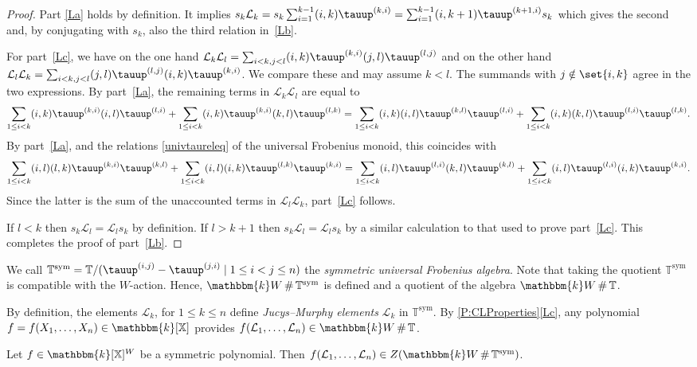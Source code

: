 \documentclass[a4paper,11pt]{amsart}
\numberwithin{equation}{subsection}
\theoremstyle{definition}
\theoremstyle{theorem}
\theoremstyle{remark}
\newcommand\CL{\mathcal{L}}
\newcommand\Sym{W}
\newcommand\op{\operatorname}
\newcommand{\ttau}{\tauup}
\newcommand\X{\mathbb{X}}
\newcommand\kk{\mathbbm{k}}
\newcommand\Tos{\mathbb{T}}
\newcommand\Tosym{\mathbb{T}^{\op{sym}}}
\DeclareMathOperator\Smash{\#}
\begin{document}
\begin{proof}
Part  \autoref{La} holds by definition. It implies
$s_k\CL_k=s_k\sum_{i=1}^{k-1}(i,k)\ttau^{(k,i)}=\sum_{i=1}^{k-1}(i,k+1)\ttau^{(k+1,i)}s_k$ which gives the
second and, by conjugating with $s_k$,  also the third relation in~\autoref{Lb}.

For part~\autoref{Lc}, we have on the one hand $\CL_k\CL_l=\sum_{i<k,
j<l}(i,k)\ttau^{(k,i)}(j,l)\ttau^{(l,j)}$ and on the other hand
$\CL_l\CL_k=\sum_{i<k, j<l}(j,l)\ttau^{(l,j)}(i,k)\ttau^{(k,i)}$. We compare these and may
assume $k<l$. The summands with $j\notin\set{i,k}$ agree in the two
expressions. By part~\autoref{La}, the remaining terms in $\CL_k\CL_l$
are equal to
\[\sum_{1\leq i<k} (i,k)\ttau^{(k,i)}(i,l)\ttau^{(l,i)}+\sum_{1\leq i<k}(i,k)\ttau^{(k,i)}(k,l)\ttau^{(l,k)}
=\sum_{1\leq i<k} (i,k)(i,l)\ttau^{(k,l)}\ttau^{(l,i)}+\sum_{1\leq i<k}(i,k)(k,l)\ttau^{(l,i)}\ttau^{(l,k)}.
\]
By part~\autoref{La}, and the relations \autoref{univtaureleq} of the universal Frobenius monoid, this coincides with
\[
\sum_{1\leq i<k}
(i,l)(l,k)\ttau^{(k,i)}\ttau^{(k,l)}+\sum_{1\leq i<k}(i,l)(i,k)\ttau^{(l,k)}\ttau^{(k,i)}
=\sum_{1\leq i<k} (i,l)\ttau^{(l,i)}(k,l)\ttau^{(k,l)}+\sum_{1\leq i<k}(i,l)\ttau^{(l,i)}(i,k)\ttau^{(k,i)}.
\]
Since the latter is the sum of the unaccounted terms in $\CL_l\CL_k$, part~\autoref{Lc} follows.

If $l<k$ then $s_k\CL_l=\CL_ls_k$ by definition. If $l>k+1$
 then $s_k\CL_l=\CL_ls_k$ by a similar calculation to that used to
prove part~\autoref{Lc}. This completes the proof of part~\autoref{Lb}.
\end{proof}
We call  $\Tosym=\Tos/(\ttau^{(i,j)}-\ttau^{(j,i)}\mid 1\leq i<j\leq n)$
the \emph{symmetric  universal Frobenius algebra}.
 Note that taking the quotient $\Tosym$ is compatible with the $W$-action. Hence, $\kk\Sym\Smash\Tosym$ is defined and a quotient of the algebra  $\kk\Sym\Smash\Tos$.

By definition, the elements $\CL_k$, for $1\le k\leq n$ define \emph{Jucys--Murphy elements} $\CL_k$ in $\Tosym$.  By \autoref{P:CLProperties}\autoref{Lc}, any polynomial $f=f(X_1,\ldots, X_n)\in\kk[\X]$ provides $f(\CL_1,\dots,\CL_n)\in\kk\Sym\Smash\Tos$.

\begin{Proposition}\label{C:UniSymmetric}
    Let  $f\in\kk[\X]^W$ be a symmetric polynomial. Then
    $f(\CL_1,\dots,\CL_n)\in Z(\kk\Sym\Smash\Tosym)$.
\end{Proposition}
\end{document}
